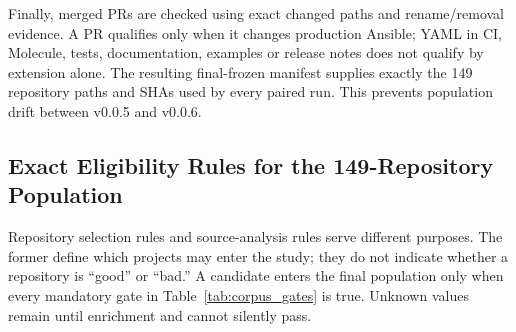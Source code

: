 Finally, merged PRs are checked using exact changed paths and rename/removal
evidence. A PR qualifies only when it changes production Ansible; YAML in CI,
Molecule, tests, documentation, examples or release notes does not qualify by
extension alone. The resulting final-frozen manifest supplies exactly the 149
repository paths and SHAs used by every paired run. This prevents population
drift between v0.0.5 and v0.0.6.

\subsection{Exact Eligibility Rules for the 149-Repository Population}
Repository selection rules and source-analysis rules serve different purposes.
The former define which projects may enter the study; they do not indicate
whether a repository is ``good'' or ``bad.'' A candidate enters the final
population only when every mandatory gate in
Table~\ref{tab:corpus_gates} is true. Unknown values remain
 until enrichment and cannot silently pass.

